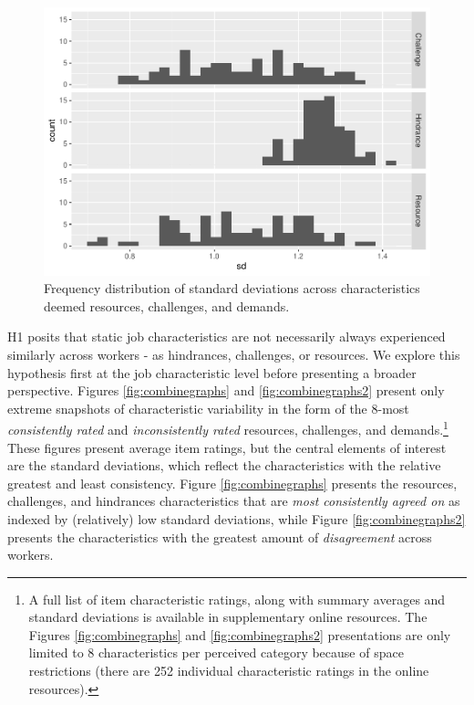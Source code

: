 \documentclass[
  english,
  man]{apa6}
\begin{document}
\begin{figure}
\centering
\includegraphics{Submission_files/figure-latex/overallhist-1.pdf}
\caption{\label{fig:overallhist}Frequency distribution of standard deviations across characteristics deemed resources, challenges, and demands.}
\end{figure}

H1 posits that static job characteristics are not necessarily always experienced similarly across workers - as hindrances, challenges, or resources. We explore this hypothesis first at the job characteristic level before presenting a broader perspective. Figures \ref{fig:combinegraphs} and \ref{fig:combinegraphs2} present only extreme snapshots of characteristic variability in the form of the 8-most \emph{consistently rated} and \emph{inconsistently rated} resources, challenges, and demands.\footnote{A full list of item characteristic ratings, along with summary averages and standard deviations is available in supplementary online resources. The Figures \ref{fig:combinegraphs} and \ref{fig:combinegraphs2} presentations are only limited to 8 characteristics per perceived category because of space restrictions (there are 252 individual characteristic ratings in the online resources).} These figures present average item ratings, but the central elements of interest are the standard deviations, which reflect the characteristics with the relative greatest and least consistency. Figure \ref{fig:combinegraphs} presents the resources, challenges, and hindrances characteristics that are \emph{most consistently agreed on} as indexed by (relatively) low standard deviations, while Figure \ref{fig:combinegraphs2} presents the characteristics with the greatest amount of \emph{disagreement} across workers.
\end{document}
